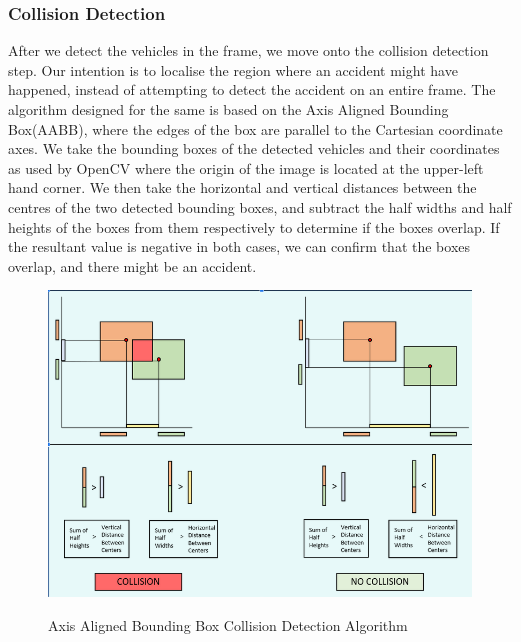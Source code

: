 \documentclass[ 12pt,a4paper,twocolumn,fleqn]{article}
\begin{document}
\begin{adjustwidth}{3.5em}{0pt}
\newpage
 \pagestyle{fancy}



\subsubsection{Collision Detection}
After we detect the vehicles in the frame, we move onto the collision detection step. Our intention is to localise the region where an accident might have happened, instead of attempting to detect the accident on an entire frame. 
The algorithm designed for the same is based on the Axis Aligned Bounding Box(AABB), where the edges of the box are parallel to the Cartesian coordinate axes. We take the bounding boxes of the detected vehicles and their coordinates as used by OpenCV where the origin of the image is located at the upper-left hand corner. We then take the horizontal and vertical distances between the centres of the two detected bounding boxes, and subtract the half widths and half heights of the boxes from them respectively to determine if the boxes overlap. If the resultant value is negative in both cases, we can confirm that the boxes overlap, and there might be an accident.

\hspace{0.2cm}

\begin{figure}[H]
\begin{center}
    \hspace*{0.4in}
    \includegraphics[scale=0.4]{media/coll.png}
    \\
    \centering
  \caption{ Axis Aligned Bounding Box Collision Detection Algorithm}
\end{center}
\end{figure}


\end{adjustwidth}
\end{document}
